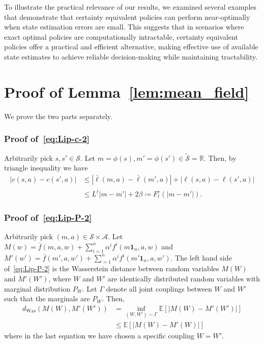 \documentclass[letterpaper, 10pt]{IEEEtran}
\theoremstyle{plain}
\theoremstyle{nonumberplain}
\theoremstyle{plain}
\newcommand*\ALPHABET{\mathcal}
\newcommand*\ABSTRACT{\tilde}
\newcommand*\EXP{\mathds{E}}
\newcommand*\reals{\mathds{R}}
\newcommand\dWas{d_{\mathrm{Was}}}
\begin{document}
To illustrate the practical relevance of our results, we examined several examples that demonstrate that certainty equivalent policies can perform near-optimally when state estimation errors are small. This suggests that in scenarios where exact optimal policies are computationally intractable, certainty equivalent policies offer a practical and efficient alternative, making effective use of available state estimates to achieve reliable decision-making while maintaining tractability.




\appendices

\section{Proof of Lemma~\ref{lem:mean_field}}\label{app:mean_field_proof}

We prove the two parts separately. 

\subsubsection{Proof of~\eqref{eq:Lip-c-2}}
Arbitrarily pick $s, s' \in \ALPHABET S$. Let $m = \phi(s), m' = \phi(s') \in \ABSTRACT{\ALPHABET S} = \reals$. Then, by triangle inequality we have
\begin{align*}
|c(s,a) - c(s',a)| &\leq |\bar \ell(m,a) - \bar \ell(m',a)| + |\ell(s,a) - \ell(s',a)| \\
&\leq L^{\bar \ell} |m - m'| + 2\beta \coloneqq F^c_t(|m - m'|).
\end{align*}

\subsubsection{Proof of~\eqref{eq:Lip-P-2}}
Arbitrarily pick $(m,a) \in \ALPHABET S \times \ALPHABET A$. Let $M(w) = \bar f (m,a,w) + \sum_{i=1}^n\alpha^i f^i(m\textbf{1}_n,a,w)$ and $M'(w') = \bar f (m',a,w') + \sum_{=1}^n\alpha^i f^i(m'\textbf{1}_n,a,w')$. The left hand side of~\eqref{eq:Lip-P-2} is the Wasserstein distance between random variables $M(W)$ and $M'(W')$, where $W$ and $W'$ are identically distributed random variables with marginal distribution $P_W$. Let $\Gamma$ denote all joint couplings between $W$ and $W'$ such that the marginals are $P_W$. Then,
\begin{align*}
\dWas(M(W),M'(W')) &= \inf_{(W,W') \sim \Gamma} \EXP[ |M(W) - M'(W')|] \\
&\leq \EXP[|M(W)-M'(W)|] 
\end{align*}
where in the last equation we have chosen a specific coupling $W = W'$. 
\end{document}
